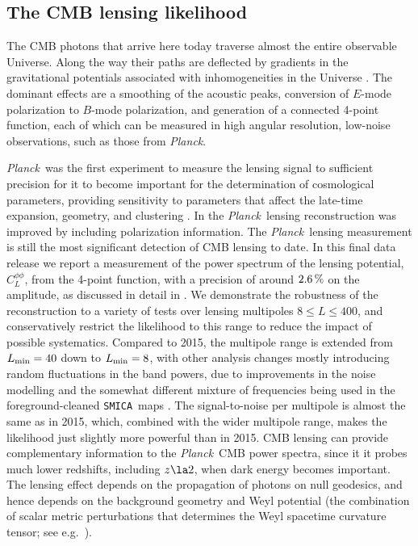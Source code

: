 \documentclass[longauth,traditabstract]{aa}
\def\Planck{\textit{Planck}}
\def\,{\thinspace}
\newcommand{\smica}{{\tt SMICA}}
\newcommand{\PlanckLensThree}{\citetalias{planck2016-l08}}
\newcommand{\planck}{\Planck}
\begin{document}
\subsection{The CMB lensing likelihood}\label{sec:lensing}

The CMB photons that arrive here today traverse almost the entire observable Universe. Along the way their paths are deflected by gradients in the gravitational potentials associated with inhomogeneities in the Universe \citep{Blanchard87}.
The dominant effects \citep[e.g.,][]{Lewis:2006fu,Hanson:2009kr} are a smoothing of
the acoustic peaks, conversion of $E$-mode polarization to $B$-mode
polarization, and generation of a connected 4-point function, each of which
can be measured in high angular resolution, low-noise observations, such
as those from \Planck.


\Planck\ was the first experiment to measure the lensing signal to sufficient
precision for it to become important for the determination of cosmological parameters, providing sensitivity to parameters that affect the late-time expansion, geometry, and clustering \citep[hereafter PL2013]{planck2013-p12}. In \citet[hereafter PL2015]{planck2014-a17} the \planck\ lensing reconstruction was
improved by including polarization information.
The \Planck\ lensing measurement is still the most significant detection of
CMB lensing to date.
In this final data release we report a measurement of the power spectrum of the lensing potential, $C_L^{\phi\phi}$, from the 4-point function, with a precision of around $2.6\,\%$ on the amplitude, as discussed in detail in \PlanckLensThree.
We demonstrate the robustness of the reconstruction to a variety of tests over lensing multipoles $8\le L \le 400$,
and conservatively restrict the likelihood to this range to reduce the impact of possible systematics. Compared to 2015, the multipole range is extended from $L_{\rm min}=40$ down to $L_{\rm min}=8$, with other analysis changes mostly introducing random fluctuations in the band powers, due to improvements in the noise modelling and the somewhat different mixture of frequencies being used in the foreground-cleaned \smica\ maps \citep[see][]{planck2016-l04}. The signal-to-noise per multipole is almost the same as in 2015, which, combined with the wider multipole range, makes the likelihood just slightly more powerful than in 2015. %
CMB lensing can provide complementary information to the \planck\ CMB power spectra, since it
it probes much lower redshifts, including $z\la 2$, when dark energy becomes important.
The lensing effect depends on the propagation of photons on null geodesics, and hence depends on  the background geometry and Weyl potential (the combination of scalar metric perturbations that determines the Weyl spacetime curvature tensor; see e.g.~\cite{Lewis:2006fu}).
\end{document}
